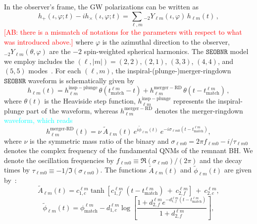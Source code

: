 \documentclass[twocolumn,prd,aps,superscriptaddress,preprintnumbers,tightenlines,showpacs,nofootinbib,eqsecnum,amsfonts,amsmath]{revtex4-1}
\newcommand{\ab}[1]{\textcolor{cyan}{#1}}
\newcommand{\comment}[1]{\textcolor{red}{[#1]}}
\newcommand{\SEOB}{\texttt{SEOBNR}}
\begin{document}
In the observer's frame, the GW polarizations can be written as 
%
\begin{equation}
h_+(\iota,\varphi;t ) - i h_\times(\iota,\varphi;t) = \sum_{\ell, m} {}_{-\!2}Y_{\ell m}(\iota,\varphi)\, h_{\ell m}(t)\,,
\end{equation}
%
\comment{AB: there is a mismatch of notations for the parameters with respect to what was introduced above.}
where $\varphi$ is the azimuthal direction to the observer, ${}_{-\!2}Y_{\ell m}(\theta,\varphi)$ are the $-2$ spin-weighted spherical harmonics. The $\SEOB$ model we employ includes the $(\ell, |m|)=(2,2),(2,1)$, $(3,3)$, $(4,4)$, and $(5,5)$ modes~\cite{Cotesta:2018fcv}. For each $(\ell, m)$, the inspiral-(plunge-)merger-ringdown $\SEOB$ waveform is schematically given by
%
\begin{equation}
h_{\ell m}(t) = h_{\ell m}^\mathrm{insp-plunge}\, \theta(t_\mathrm{match}^{\ell m} - t) + h_{\ell m}^\mathrm{merger-RD}\,\theta(t-t_\mathrm{match}^{\ell m})\,,
\end{equation}
where $\theta(t)$ is the Heaviside step function, $h_{\ell m}^\mathrm{insp-plunge}$ represents the inspiral-plunge part of the waveform, whereas $h_{\ell m}^\mathrm{merger-RD}$ denotes the merger-ringdown \ab{waveform, which reads~\citep{Bohe:2016gbl,Cotesta:2018fcv}}
%
\begin{equation}
\label{RD}
h_{\ell m}^{\textrm{merger-RD}}(t) = \nu \ \tilde{A}_{\ell m}(t)\ e^{i \tilde{\phi}_{\ell m}(t)} \ e^{-i \sigma_{\ell m 0}(t-t_{\textrm{match}}^{\ell m})},
\end{equation}
%
where $\nu$ is the symmetric mass ratio of the binary and $\sigma_{\ell m0} = 2\pi f_{\ell m 0} -i/\tau_{\ell m 0}$ denotes the complex frequency of the fundamental QNMs of the remnant BH. We denote the oscillation frequencies by $f_{\ell m  0}\equiv \Re(\sigma_{\ell m0})/(2\pi)$ and the decay times by $\tau_{\ell m 0}\equiv -1/\Im(\sigma_{\ell m0}) $. 
The functions $\tilde{A}_{\ell m}(t)$ and $\tilde{\phi}_{\ell m}(t)$ are given by~\cite{Bohe:2016gbl,Cotesta:2018fcv}:
%
\begin{equation}
\label{eq:ansatz_amp}
\tilde{A}_{\ell m}(t) = c_{1,c}^{\ell m} \tanh[c_{1,f}^{\ell m}\ (t-t_{\textrm{match}}^{\ell m}) \ +\ c_{2,f}^{\ell m}] \ + \ c_{2,c}^{\ell m},
\end{equation}
%
\begin{equation}
\label{eq:ansatz_phase}
\tilde{\phi}_{\ell m}(t) = \phi_{\textrm{match}}^{\ell m} - d_{1,c}^{\ell m} \log\left[\frac{1+d_{2,f}^{\ell m} e^{-d_{1,f}^{\ell m}(t-t_{\textrm{match}}^{\ell m})}}{1+d_{2,f}^{\ell m}}\right],
\end{equation}
\end{document}
